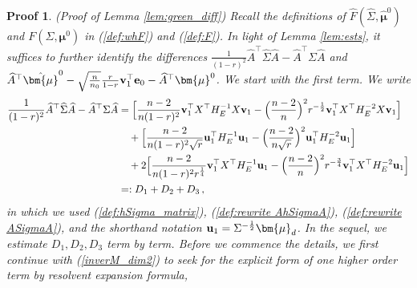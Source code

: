 \documentclass[12pt]{article}
\numberwithin{equation}{section}
\newtheorem{myPro}{Proof}
\theoremstyle{remark}
\newcommand{\1}{{\rm 1}\kern-0.24em{\rm I}}
\begin{document}
\begin{appendices}
\begin{myPro}{(Proof of Lemma \ref{lem:green_diff})}
Recall the definitions of $\widehat{F}(\widehat\Sigma, \hat{\bm{\mu}}^0)$ and $F(\Sigma, {\bm{\mu}}^0)$  in (\ref{def:whF}) and (\ref{def:F}).  In light of Lemma \ref{lem:ests}, it suffices to further identify  the differences $\frac{1}{(1-r)^2} \widehat A^{\top}\widehat\Sigma \widehat A - \widehat A^{\top}\Sigma \widehat A$ and $\widehat{A} ^{\top} \hat{\bm{\mu}}^0- \sqrt{\frac{n}{n_0}} \frac{r}{1-r} {\bf v}_1^{\top} {\bf e}_0 - \widehat{A} ^{\top} {\bm{\mu}}^0$. We start with the first term.  We write
\begin{align*}
 \frac{1}{(1-r)^2} \widehat A^{\top}\widehat\Sigma \widehat A - \widehat A^{\top}\Sigma \widehat A
&=\Big[\frac{n-2}{n(1-r)^2}  {\bf v}_1^{\top} {X}^{\top} H_E^{-1}  {X}{\bf v}_1 - \Big(\frac{n-2}{n}\Big)^2  r^{-\frac 12} {\bf v}_1^{\top} {X}^{\top} H_E^{-2}  {X}{\bf v}_1\Big] \notag\\
&\quad + \Big[\frac{n-2}{n(1-r )^2\sqrt r}  {\bf u}_1^{\top} H_E^{-1} {\bf u}_1 - \Big(\frac{n-2}{n\sqrt r}\Big)^2  {\bf u}_1^{\top} H_E^{-2} {\bf u}_1 \Big]\notag\\
&\quad + 2\Big[\frac{n-2}{n(1-r)^2r^{\frac 14}}  {\bf v}_1^{\top} {X}^{\top} H_E^{-1} {\bf u}_1 - \Big(\frac{n-2}{n}\Big)^2 r^{-\frac 34}  {\bf v}_1^{\top} {X}^{\top} H_E^{-2} {\bf u}_1 \Big]\notag\\
&=: D_1+D_2+D_3\,,
\end{align*}
in which we used (\ref{def:hSigma_matrix}), (\ref{def:rewrite AhSigmaA}), (\ref{def:rewrite ASigmaA}), and the shorthand notation ${\bf u}_1=\Sigma^{-\frac 12} {\bm{\mu}}_d $. In the sequel, we estimate $D_1, D_2, D_3$ term by term. Before we commence the details,  we first continue with (\ref{inverM_dim2}) to seek for the explicit form of one higher order term by resolvent expansion formula, \begin{align}\label{2020092801}

\end{align}
\end{myPro}
\end{appendices}
\end{document}
